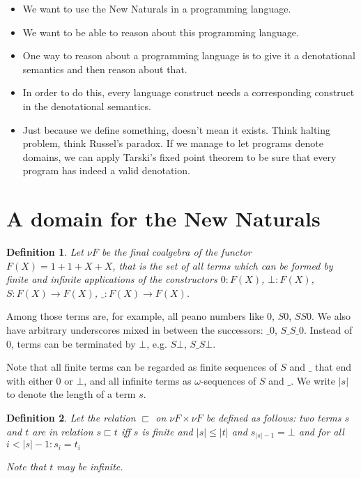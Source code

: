 \documentclass[a4paper]{article}
\newcommand{\arr}{\rightarrow}
\newtheorem{defNuF}{Definition}[section]
\newtheorem{defStrictOrderNuF}[defNuF]{Definition}
\begin{document}
\begin{itemize}

\item We want to use the New Naturals in a programming language.

\item We want to be able to reason about this programming language.

\item One way to reason about a programming language is to give it a
denotational semantics and then reason about that.

\item In order to do this, every language construct needs a corresponding
construct in the denotational semantics.

\item Just because we define something, doesn't mean it exists.  Think halting
problem, think Russel's paradox. If we manage to let programs denote domains,
we can apply Tarski's fixed point theorem to be sure that every program has
indeed a valid denotation.

\end{itemize}

\section{A domain for the New Naturals}

\begin{defNuF}

Let $\nu F$ be the final coalgebra of the functor $F(X) = 1 + 1 + X + X$, that
is the set of all terms which can be formed by finite and infinite applications
of the constructors $0:F(X)$, $\bot:F(X)$, $S:F(X) \arr F(X)$, $\_:F(X) \arr
F(X)$.

\end{defNuF}


Among those terms are, for example, all peano numbers like $0$, $S0$, $SS0$.
We also have arbitrary underscores mixed in between the successors: $\_0$,
$S\_S\_0$.  Instead of $0$, terms can be terminated by $\bot$, e.g.  $S\bot$,
$S\_S\bot$.

Note that all finite terms can be regarded as finite sequences of $S$ and $\_$
that end with either $0$ or $\bot$, and all infinite terms as
$\omega$-sequences of $S$ and $\_$.  We write $|s|$ to denote the length of a
term $s$.



\begin{defStrictOrderNuF}

Let the relation $\sqsubset$ on $\nu F \times \nu F$ be defined as follows: two
terms $s$ and $t$ are in relation $s \sqsubset t$ iff $s$ is finite and $|s|
\leq |t|$ and $s_{|s|-1} = \bot$ and for all $i < |s|-1: s_i = t_i$

Note that $t$ may be infinite.

\end{defStrictOrderNuF}
\end{document}
